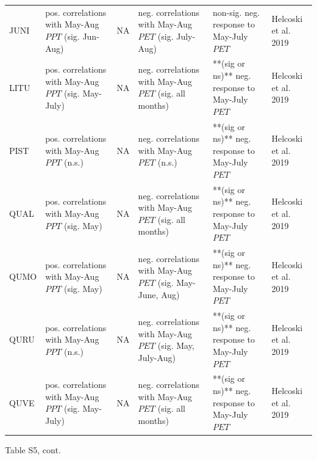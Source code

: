 \documentclass[
]{article}
\begin{document}
\begin{longtable}{l>{\raggedright\arraybackslash}p{2.5cm}>{\raggedright\arraybackslash}p{2.5cm}>{\raggedright\arraybackslash}p{2.5cm}>{\raggedright\arraybackslash}p{2.5cm}>{\raggedright\arraybackslash}p{2cm}}
\hspace{1em}JUNI & pos. correlations with May-Aug $PPT$ (sig. Jun-Aug) & NA & neg. correlations with May-Aug $PET$ (sig. July-Aug) & non-sig. neg. response to May-July $PET$ & Helcoski et al. 2019\\
\hspace{1em}LITU & pos. correlations with May-Aug $PPT$ (sig. May-July) & NA & neg. correlations with May-Aug $PET$ (sig. all months) & **(sig or ns)** neg. response to May-July $PET$ & Helcoski et al. 2019\\
\hspace{1em}PIST & pos. correlations with May-Aug $PPT$ (n.s.) & NA & neg. correlations with May-Aug $PET$ (n.s.) & **(sig or ns)** neg. response to May-July $PET$ & Helcoski et al. 2019\\
\hspace{1em}QUAL & pos. correlations with May-Aug $PPT$ (sig. May) & NA & neg. correlations with May-Aug $PET$ (sig. all months) & **(sig or ns)** neg. response to May-July $PET$ & Helcoski et al. 2019\\
\hspace{1em}QUMO & pos. correlations with May-Aug $PPT$ (sig. May) & NA & neg. correlations with May-Aug $PET$ (sig. May-June, Aug) & **(sig or ns)** neg. response to May-July $PET$ & Helcoski et al. 2019\\
\hspace{1em}QURU & pos. correlations with May-Aug $PPT$ (n.s.) & NA & neg. correlations with May-Aug $PET$ (sig. May, July-Aug) & **(sig or ns)** neg. response to May-July $PET$ & Helcoski et al. 2019\\
\hspace{1em}QUVE & pos. correlations with May-Aug $PPT$ (sig. May-July) & NA & neg. correlations with May-Aug $PET$ (sig. all months) & **(sig or ns)** neg. response to May-July $PET$ & Helcoski et al. 2019\\
\bottomrule
\end{longtable}
\endgroup{}

\newpage

Table S5, cont. \begingroup\fontsize{7}{9}\selectfont
\end{document}
